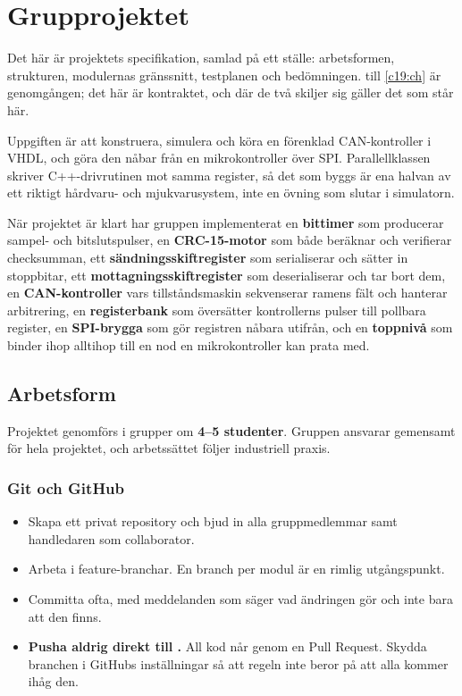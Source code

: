 
\chapter{Grupprojektet}
\label{app:project}

Det här är projektets specifikation, samlad på ett ställe: arbetsformen, strukturen, modulernas
gränssnitt, testplanen och bedömningen.  till \ref{c19:ch} är genomgången; det här är
kontraktet, och där de två skiljer sig gäller det som står här.

Uppgiften är att konstruera, simulera och köra en förenklad CAN-kontroller i VHDL, och göra den
nåbar från en mikrokontroller över SPI. Parallellklassen skriver C++-drivrutinen mot samma register,
så det som byggs är ena halvan av ett riktigt hårdvaru- och mjukvarusystem, inte en övning som slutar
i simulatorn.

När projektet är klart har gruppen implementerat en \textbf{bittimer} som producerar sampel- och
bitslutspulser, en \textbf{CRC-15-motor} som både beräknar och verifierar checksumman, ett
\textbf{sändningsskiftregister} som serialiserar och sätter in stoppbitar, ett
\textbf{mottagningsskiftregister} som deserialiserar och tar bort dem, en \textbf{CAN-kontroller}
vars tillståndsmaskin sekvenserar ramens fält och hanterar arbitrering, en \textbf{registerbank} som
översätter kontrollerns pulser till pollbara register, en \textbf{SPI-brygga} som gör registren
nåbara utifrån, och en \textbf{toppnivå} som binder ihop alltihop till en nod en mikrokontroller kan
prata med.

\section{Arbetsform}
\label{app:project:work}

Projektet genomförs i grupper om \textbf{4--5 studenter}. Gruppen ansvarar gemensamt för hela
projektet, och arbetssättet följer industriell praxis.

\subsection{Git och GitHub}
\begin{itemize}
  \item Skapa ett privat repository och bjud in alla gruppmedlemmar samt handledaren som
    collaborator.
  \item Arbeta i feature-branchar. En branch per modul är en rimlig utgångspunkt.
  \item Committa ofta, med meddelanden som säger vad ändringen gör och inte bara att den finns.
  \item \textbf{Pusha aldrig direkt till .} All kod når  genom en Pull
    Request. Skydda branchen i GitHubs inställningar så att regeln inte beror på att alla kommer
    ihåg den.
\end{itemize}

